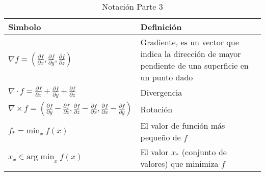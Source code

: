 \begin{table}[H]
    \begin{center}
        \begin{tabularx}{\textwidth}{|l|X|}
            \hline
            \textbf{Simbolo}                                                                                                                                                                                                                  & \textbf{Definición}                                                                                   \\
            \hline
            $ \nabla f = \left( \frac{\partial f}{\partial x}, \frac{\partial f}{\partial y}, \frac{\partial f}{\partial z} \right) $                                                                                                         & Gradiente, es un vector que indica la dirección de mayor pendiente de una superficie en un punto dado \\
            $ \nabla \cdot f =  \frac{\partial f}{\partial x} + \frac{\partial f}{\partial y} + \frac{\partial f}{\partial z} $                                                                                                               & Divergencia                                                                                           \\
            $ \nabla \times f =  \left( \frac{\partial f}{\partial y} - \frac{\partial f}{\partial z}, \frac{\partial f}{\partial z} - \frac{\partial f}{\partial x}, \frac{\partial f}{\partial x} - \frac{\partial f}{\partial y}  \right)$ & Rotación                                                                                              \\
            $ f_{*} = \text{min}_x~f(x) $                                                                                                                                                                                                     & El valor de función más pequeño de $f$                                                                \\
            $ {x}_x \in \text{arg min}_{x}~f(x) $                                                                                                                                                                                             & El valor $x_{*}$ (conjunto de valores) que minimiza $f$                                               \\

            \hline
        \end{tabularx}
        \caption{Notación Parte 3}
        \label{tab:nnotation-part-3}
    \end{center}
\end{table}


